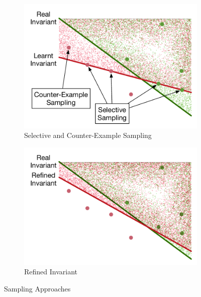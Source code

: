 \begin{figure}[!h]
\begin{subfigure}{0.23\textwidth}
        \includegraphics[scale=0.3]{figures/general-sampling-2.pdf}
        \caption{Selective and Counter-Example Sampling}
        \label{fig:sampling:selective}
    \end{subfigure}
    \begin{subfigure}{0.23\textwidth}
        \centering
        \includegraphics[scale=0.3]{figures/general-sampling-3.pdf}
        \caption{Refined Invariant}
        \label{fig:sampling:selective:invariant}
    \end{subfigure}
    \caption{Sampling Approaches}
    \label{fig:sampling}
\end{figure}

